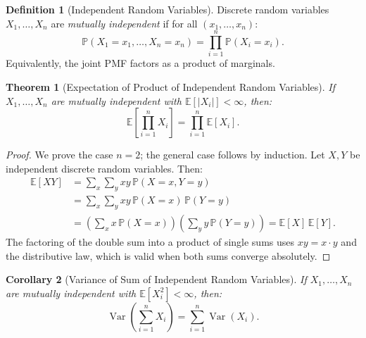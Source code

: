 \documentclass[11pt,a4paper]{article}
\theoremstyle{definition}
\newtheorem{definition}{Definition}[section]
\theoremstyle{plain}
\newtheorem{theorem}{Theorem}[section]
\newtheorem{corollary}[theorem]{Corollary}
\theoremstyle{remark}
\DeclareMathOperator{\Var}{Var}
\newcommand{\E}{\mathbb{E}}
\newcommand{\Prob}{\mathbb{P}}
\begin{document}
\begin{definition}[Independent Random Variables]
\label{def:indep_rv}
Discrete random variables $X_1, \ldots, X_n$ are \emph{mutually independent} if for all $(x_1, \ldots, x_n)$:
\begin{equation}
    \Prob(X_1 = x_1, \ldots, X_n = x_n) = \prod_{i=1}^n \Prob(X_i = x_i).
    \label{eq:indep_rv}
\end{equation}
Equivalently, the joint PMF factors as a product of marginals.
\end{definition}

\begin{keyresult}
\begin{theorem}[Expectation of Product of Independent Random Variables]
\label{thm:product_exp}
If $X_1, \ldots, X_n$ are mutually independent with $\E[|X_i|] < \infty$, then:
\begin{equation}
    \E\!\left[\prod_{i=1}^n X_i\right] = \prod_{i=1}^n \E[X_i].
    \label{eq:product_exp}
\end{equation}
\end{theorem}
\end{keyresult}

\begin{proof}
We prove the case $n = 2$; the general case follows by induction. Let $X, Y$ be independent discrete random variables. Then:
\begin{align}
    \E[XY] &= \sum_x \sum_y xy\, \Prob(X = x, Y = y) \nonumber\\
    &= \sum_x \sum_y xy\, \Prob(X = x)\, \Prob(Y = y) \tag{independence}\\
    &= \left(\sum_x x\, \Prob(X = x)\right)\left(\sum_y y\, \Prob(Y = y)\right) = \E[X]\, \E[Y]. \label{eq:product_exp_proof}
\end{align}
The factoring of the double sum into a product of single sums uses $xy = x \cdot y$ and the distributive law, which is valid when both sums converge absolutely.
\end{proof}

\begin{corollary}[Variance of Sum of Independent Random Variables]
\label{cor:var_sum}
If $X_1, \ldots, X_n$ are mutually independent with $\E[X_i^2] < \infty$, then:
\begin{equation}
    \Var\!\left(\sum_{i=1}^n X_i\right) = \sum_{i=1}^n \Var(X_i).
    \label{eq:var_sum}
\end{equation}
\end{corollary}
\end{document}
